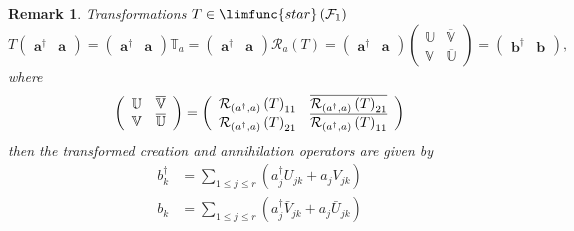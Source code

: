 \documentclass[aps,preprint]{revtex4}
\newtheorem{remark}[theorem]{Remark}
\begin{document}
\begin{remark}
Transformations $T\in \limfunc{star}\left( \mathcal{F}_{1}\right) $ 
\begin{equation}
T\left( 
\begin{array}{cc}
\mathbf{a}^{\dagger } & \mathbf{a}%
\end{array}%
\right) =\left( 
\begin{array}{cc}
\mathbf{a}^{\dagger } & \mathbf{a}%
\end{array}%
\right) \mathbb{T}_{a}=\left( 
\begin{array}{cc}
\mathbf{a}^{\dagger } & \mathbf{a}%
\end{array}%
\right) \mathcal{R}_{a}\left( T\right) =\left( 
\begin{array}{cc}
\mathbf{a}^{\dagger } & \mathbf{a}%
\end{array}%
\right) \left( 
\begin{array}{cc}
\mathbb{U} & \overline{\mathbb{V}} \\ 
\mathbb{V} & \overline{\mathbb{U}}%
\end{array}%
\right) =\left( 
\begin{array}{cc}
\mathbf{b}^{\dagger } & \mathbf{b}%
\end{array}%
\right) ,
\end{equation}%
where 
\begin{equation}
\left( 
\begin{array}{cc}
\mathbb{U} & \overline{\mathbb{V}} \\ 
\mathbb{V} & \overline{\mathbb{U}}%
\end{array}%
\right) =\left( 
\begin{array}{cc}
\mathcal{R}_{\left( a^{\dagger },a\right) }\left( T\right) _{11} & \overline{%
\mathcal{R}_{\left( a^{\dagger },a\right) }\left( T\right) _{21}} \\ 
\mathcal{R}_{\left( a^{\dagger },a\right) }\left( T\right) _{21} & \overline{%
\mathcal{R}_{\left( a^{\dagger },a\right) }\left( T\right) _{11}}%
\end{array}%
\right)
\end{equation}%
then the transformed creation and annihilation operators are given by 
\begin{align}
b_{k}^{\dagger }& =\sum_{1\leq j\leq r}\left( a_{j}^{\dagger
}U_{jk}+a_{j}V_{jk}\right) \\
b_{k}& =\sum_{1\leq j\leq r}\left( a_{j}^{\dagger }\bar{V}_{jk}+a_{j}\bar{U}%
_{jk}\right)
\end{align}
\end{remark}
\end{document}
